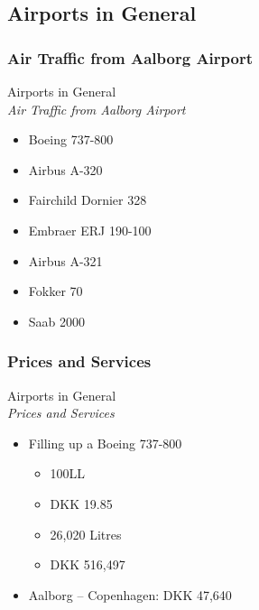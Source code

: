 \subsection{Airports in General}

\subsubsection{Air Traffic from Aalborg Airport}
\begin{frame}{Airports in General\\\textit{Air Traffic from Aalborg Airport}}{}
	\begin{itemize}
		\item Boeing 737-800 
		\item Airbus A-320 
		\item Fairchild Dornier 328 
		\item Embraer ERJ 190-100 
		\item Airbus A-321 
		\item Fokker 70 
		\item Saab 2000 
	\end{itemize}
\end{frame}

\subsubsection{Prices and Services}
\begin{frame}{Airports in General\\\textit{Prices and Services}}{}
	\begin{itemize}
		\item Filling up a Boeing 737-800
			\begin{itemize}
				\item 100LL
				\item DKK 19.85
				\item 26,020 Litres
				\item DKK 516,497
			\end{itemize}
		\item Aalborg – Copenhagen: DKK 47,640
	\end{itemize}
\end{frame}

